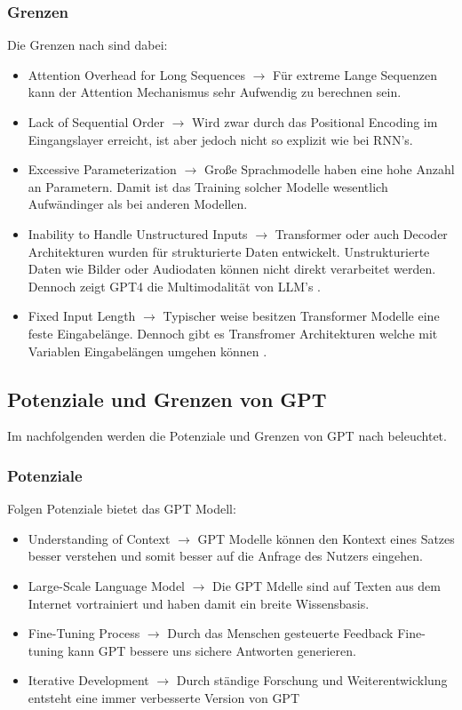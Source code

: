 \documentclass[conference]{IEEEtran}
\begin{document}
\subsubsection{Grenzen}
Die Grenzen nach \cite{kulkarniAppliedGenerativeAI2023} sind dabei:
\begin{itemize}
    \item Attention Overhead for Long Sequences $\rightarrow$ Für extreme Lange Sequenzen kann der Attention Mechanismus sehr Aufwendig zu berechnen sein.
    \item Lack of Sequential Order $\rightarrow$ Wird zwar durch das Positional Encoding im Eingangslayer erreicht, ist aber jedoch nicht so explizit wie bei RNN's.
    \item Excessive Parameterization $\rightarrow$ Große Sprachmodelle haben eine hohe Anzahl an Parametern. Damit ist das Training solcher Modelle wesentlich Aufwändinger als bei anderen Modellen.
    \item Inability to Handle Unstructured Inputs $\rightarrow$ Transformer oder auch Decoder Architekturen wurden für strukturierte Daten entwickelt. Unstrukturierte Daten wie Bilder oder Audiodaten können nicht direkt verarbeitet werden. Dennoch zeigt GPT4 die Multimodalität von LLM's \cite{openaiGPT4TechnicalReport2024}.
    \item Fixed Input Length $\rightarrow$ Typischer weise besitzen Transformer Modelle eine feste Eingabelänge. Dennoch gibt es Transfromer Architekturen welche mit Variablen Eingabelängen umgehen können \cite{kulkarniChatGPTArchitectureInDepth2023}. 
\end{itemize}
\subsection{Potenziale und Grenzen von GPT}
Im nachfolgenden werden die Potenziale und Grenzen von GPT nach \cite{kulkarniChatGPTArchitectureInDepth2023} beleuchtet.
\subsubsection{Potenziale}
Folgen Potenziale bietet das GPT Modell:
\begin{itemize}
    \item Understanding of Context $\rightarrow$ GPT Modelle können den Kontext eines Satzes besser verstehen und somit besser auf die Anfrage des Nutzers eingehen.
    \item Large-Scale Language Model $\rightarrow$ Die GPT Mdelle sind auf Texten aus dem Internet vortrainiert und haben damit ein breite Wissensbasis.
    \item Fine-Tuning Process $\rightarrow$ Durch das Menschen gesteuerte Feedback Fine-tuning kann GPT bessere uns sichere Antworten generieren.
    \item Iterative Development $\rightarrow$ Durch ständige Forschung und Weiterentwicklung entsteht eine immer verbesserte Version von GPT
\end{itemize}
\end{document}
